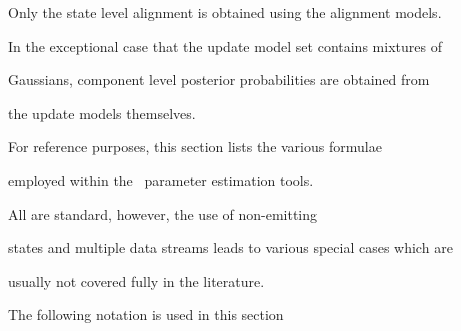 Only the state level alignment is obtained using the alignment models.


In the exceptional case that the update model set contains mixtures of


Gaussians, component level posterior probabilities are obtained from


the update models themselves.












For reference purposes, this section lists the various formulae 


employed within the \HTK\ parameter estimation tools. 


All are standard, however, the use of non-emitting


states and multiple data streams leads to various special cases which are


usually not covered fully in the literature.





The following notation is used in this section


